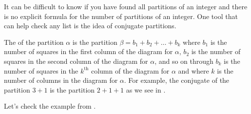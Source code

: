 It can be difficult to know if you have found all partitions of an integer and there is no explicit formula for the number of partitions of an integer.  One tool that can help check any list is the idea of conjugate partitions.

\begin{defn}    
\label{defn_conjugate_partition}
    The  of the partition $\alpha$ is the partition $\beta = b_1+b_2+ \ldots +b_k$  where $b_1$ is the number of squares in the first column of the diagram for $\alpha$, $b_2$ is the number of squares in the second column of the diagram for $\alpha$, and so on through $b_k$ is the number of squares in the $k^{\text{th}}$ column of the diagram for $\alpha$ and where $k$ is the number of columns in the diagram for $\alpha$.  For example, the conjugate of the partition $3+1$ is the partition $2+1+1$ as we see in .
\end{defn} 

Let's check the example from .

